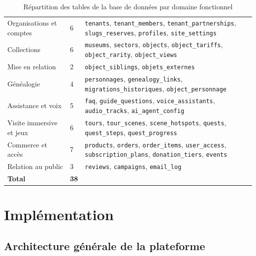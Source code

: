 \begin{table}[htbp]
\centering
\caption{Répartition des tables de la base de données par domaine fonctionnel}
\label{tab:tables}
\small
\begin{tabularx}{\textwidth}{|L{4.2cm}|C{1.6cm}|X|}
\hline
{}
 &  &  \\ \hline
Organisations et comptes & 6 & \texttt{tenants}, \texttt{tenant\_members}, \texttt{tenant\_partnerships}, \texttt{slugs\_reserves}, \texttt{profiles}, \texttt{site\_settings} \\ \hline
Collections & 6 & \texttt{museums}, \texttt{sectors}, \texttt{objects}, \texttt{object\_tariffs}, \texttt{object\_rarity}, \texttt{object\_views} \\ \hline
Mise en relation & 2 & \texttt{object\_siblings}, \texttt{objets\_externes} \\ \hline
Généalogie & 4 & \texttt{personnages}, \texttt{genealogy\_links}, \texttt{migrations\_historiques}, \texttt{object\_personnage} \\ \hline
Assistance et voix & 5 & \texttt{faq}, \texttt{guide\_questions}, \texttt{voice\_assistants}, \texttt{audio\_tracks}, \texttt{ai\_agent\_config} \\ \hline
Visite immersive et jeux & 6 & \texttt{tours}, \texttt{tour\_scenes}, \texttt{scene\_hotspots}, \texttt{quests}, \texttt{quest\_steps}, \texttt{quest\_progress} \\ \hline
Commerce et accès & 7 & \texttt{products}, \texttt{orders}, \texttt{order\_items}, \texttt{user\_access}, \texttt{subscription\_plans}, \texttt{donation\_tiers}, \texttt{events} \\ \hline
Relation au public & 3 & \texttt{reviews}, \texttt{campaigns}, \texttt{email\_log} \\ \hline
{}
\textbf{Total} & \textbf{38} & \\ \hline
\end{tabularx}
\end{table}

\section{Implémentation}
\label{sec:implementation}

\subsection{Architecture générale de la plateforme}

